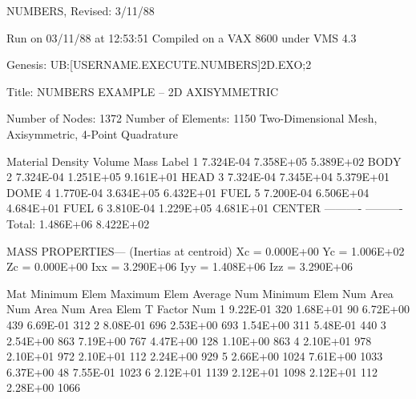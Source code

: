      NUMBERS, Revised:  3/11/88

     Run on 03/11/88 at 12:53:51
     Compiled on a VAX 8600 under VMS 4.3

     Genesis: UB:[USERNAME.EXECUTE.NUMBERS]2D.EXO;2

     Title:   NUMBERS EXAMPLE -- 2D AXISYMMETRIC

     Number of Nodes:      1372
     Number of Elements:   1150
     Two-Dimensional Mesh, Axisymmetric, 4-Point Quadrature

     Material    Density        Volume          Mass        Label
         1      7.324E-04      7.358E+05      5.389E+02     BODY
         2      7.324E-04      1.251E+05      9.161E+01     HEAD
         3      7.324E-04      7.345E+04      5.379E+01     DOME
         4      1.770E-04      3.634E+05      6.432E+01     FUEL
         5      7.200E-04      6.506E+04      4.684E+01     FUEL
         6      3.810E-04      1.229E+05      4.681E+01     CENTER
                              ----------     ----------
                  Total:       1.486E+06      8.422E+02

     MASS PROPERTIES--- (Inertias at centroid)
      Xc =  0.000E+00   Yc =  1.006E+02   Zc =  0.000E+00
     Ixx =  3.290E+06  Iyy =  1.408E+06  Izz =  3.290E+06


     Mat  Minimum   Elem   Maximum   Elem   Average   Num    Minimum   Elem
     Num    Area    Num      Area    Num      Area    Elem   T Factor  Num
      1   9.22E-01   320   1.68E+01    90   6.72E+00   439   6.69E-01   312
      2   8.08E-01   696   2.53E+00   693   1.54E+00   311   5.48E-01   440
      3   2.54E+00   863   7.19E+00   767   4.47E+00   128   1.10E+00   863
      4   2.10E+01   978   2.10E+01   972   2.10E+01   112   2.24E+00   929
      5   2.66E+00  1024   7.61E+00  1033   6.37E+00    48   7.55E-01  1023
      6   2.12E+01  1139   2.12E+01  1098   2.12E+01   112   2.28E+00  1066
